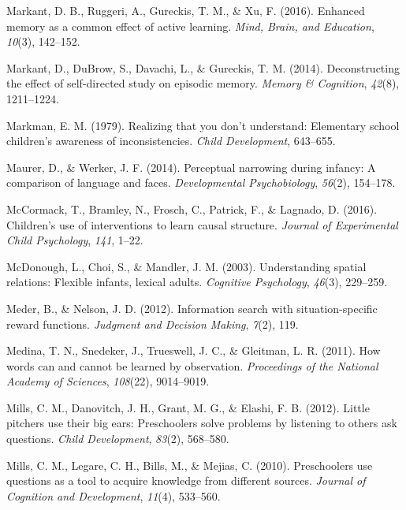 \documentclass[english,floatsintext,man]{apa6}
\theoremstyle{definition}
\theoremstyle{definition}
\theoremstyle{definition}
\theoremstyle{remark}
\begin{document}
\hypertarget{ref-markant2016enhanced}{}
Markant, D. B., Ruggeri, A., Gureckis, T. M., \& Xu, F. (2016). Enhanced
memory as a common effect of active learning. \emph{Mind, Brain, and
Education}, \emph{10}(3), 142--152.

\hypertarget{ref-markant2014deconstructing}{}
Markant, D., DuBrow, S., Davachi, L., \& Gureckis, T. M. (2014).
Deconstructing the effect of self-directed study on episodic memory.
\emph{Memory \& Cognition}, \emph{42}(8), 1211--1224.

\hypertarget{ref-markman1979realizing}{}
Markman, E. M. (1979). Realizing that you don't understand: Elementary
school children's awareness of inconsistencies. \emph{Child
Development}, 643--655.

\hypertarget{ref-maurer2014perceptual}{}
Maurer, D., \& Werker, J. F. (2014). Perceptual narrowing during
infancy: A comparison of language and faces. \emph{Developmental
Psychobiology}, \emph{56}(2), 154--178.

\hypertarget{ref-mccormack2016children}{}
McCormack, T., Bramley, N., Frosch, C., Patrick, F., \& Lagnado, D.
(2016). Children's use of interventions to learn causal structure.
\emph{Journal of Experimental Child Psychology}, \emph{141}, 1--22.

\hypertarget{ref-mcdonough2003understanding}{}
McDonough, L., Choi, S., \& Mandler, J. M. (2003). Understanding spatial
relations: Flexible infants, lexical adults. \emph{Cognitive
Psychology}, \emph{46}(3), 229--259.

\hypertarget{ref-meder2012information}{}
Meder, B., \& Nelson, J. D. (2012). Information search with
situation-specific reward functions. \emph{Judgment and Decision
Making}, \emph{7}(2), 119.

\hypertarget{ref-medina2011words}{}
Medina, T. N., Snedeker, J., Trueswell, J. C., \& Gleitman, L. R.
(2011). How words can and cannot be learned by observation.
\emph{Proceedings of the National Academy of Sciences}, \emph{108}(22),
9014--9019.

\hypertarget{ref-mills2012little}{}
Mills, C. M., Danovitch, J. H., Grant, M. G., \& Elashi, F. B. (2012).
Little pitchers use their big ears: Preschoolers solve problems by
listening to others ask questions. \emph{Child Development},
\emph{83}(2), 568--580.

\hypertarget{ref-mills2010preschoolers}{}
Mills, C. M., Legare, C. H., Bills, M., \& Mejias, C. (2010).
Preschoolers use questions as a tool to acquire knowledge from different
sources. \emph{Journal of Cognition and Development}, \emph{11}(4),
533--560.
\end{document}
